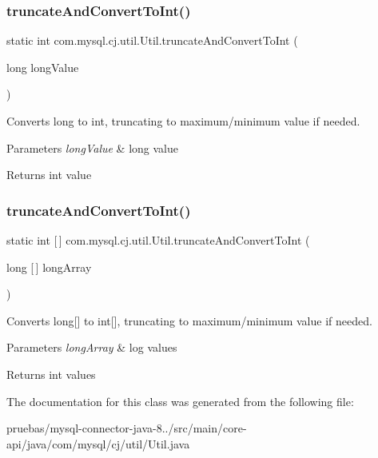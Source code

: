 \subsubsection{\texorpdfstring{truncate\+And\+Convert\+To\+Int()}{truncateAndConvertToInt()}\hspace{0.1cm}{\footnotesize\ttfamily [1/2]}}
{\footnotesize\ttfamily static int com.\+mysql.\+cj.\+util.\+Util.\+truncate\+And\+Convert\+To\+Int (\begin{DoxyParamCaption}\item[{long}]{long\+Value }\end{DoxyParamCaption})\hspace{0.3cm}{\ttfamily [static]}}

Converts long to int, truncating to maximum/minimum value if needed.


\begin{DoxyParams}{Parameters}
{\em long\+Value} & long value \\
\hline
\end{DoxyParams}
\begin{DoxyReturn}{Returns}
int value 
\end{DoxyReturn}
\mbox{\label{classcom_1_1mysql_1_1cj_1_1util_1_1_util_a73b0a7029da0c63b85399eeee5d36527}} 
\subsubsection{\texorpdfstring{truncate\+And\+Convert\+To\+Int()}{truncateAndConvertToInt()}\hspace{0.1cm}{\footnotesize\ttfamily [2/2]}}
{\footnotesize\ttfamily static int \mbox{[}$\,$\mbox{]} com.\+mysql.\+cj.\+util.\+Util.\+truncate\+And\+Convert\+To\+Int (\begin{DoxyParamCaption}\item[{long \mbox{[}$\,$\mbox{]}}]{long\+Array }\end{DoxyParamCaption})\hspace{0.3cm}{\ttfamily [static]}}

Converts long\mbox{[}\mbox{]} to int\mbox{[}\mbox{]}, truncating to maximum/minimum value if needed.


\begin{DoxyParams}{Parameters}
{\em long\+Array} & log values \\
\hline
\end{DoxyParams}
\begin{DoxyReturn}{Returns}
int values 
\end{DoxyReturn}


The documentation for this class was generated from the following file\+:\begin{DoxyCompactItemize}
\item 
pruebas/mysql-\/connector-\/java-\/8../src/main/core-\/api/java/com/mysql/cj/util/Util.\+java\end{DoxyCompactItemize}
